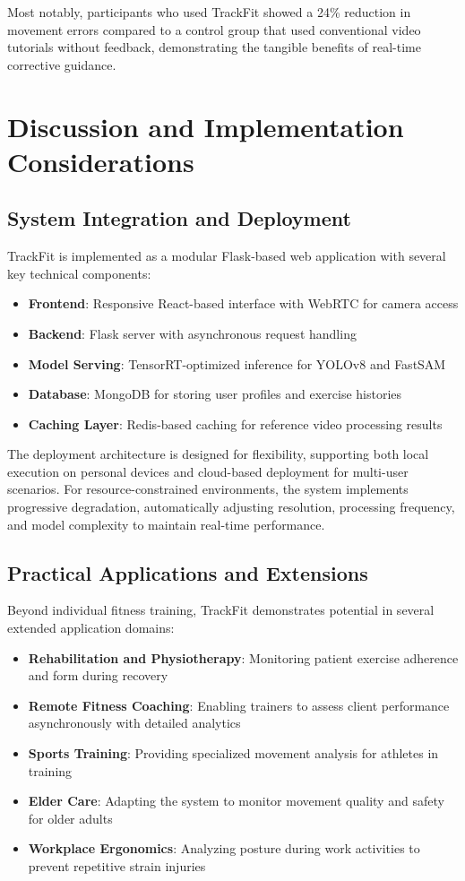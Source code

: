 \documentclass[conference]{IEEEtran}
\begin{document}
Most notably, participants who used TrackFit showed a 24\% reduction in movement errors compared to a control group that used conventional video tutorials without feedback, demonstrating the tangible benefits of real-time corrective guidance.

\section{Discussion and Implementation Considerations}

\subsection{System Integration and Deployment}
TrackFit is implemented as a modular Flask-based web application with several key technical components:

\begin{itemize}
    \item \textbf{Frontend}: Responsive React-based interface with WebRTC for camera access
    \item \textbf{Backend}: Flask server with asynchronous request handling
    \item \textbf{Model Serving}: TensorRT-optimized inference for YOLOv8 and FastSAM
    \item \textbf{Database}: MongoDB for storing user profiles and exercise histories
    \item \textbf{Caching Layer}: Redis-based caching for reference video processing results
\end{itemize}

The deployment architecture is designed for flexibility, supporting both local execution on personal devices and cloud-based deployment for multi-user scenarios. For resource-constrained environments, the system implements progressive degradation, automatically adjusting resolution, processing frequency, and model complexity to maintain real-time performance.

\subsection{Practical Applications and Extensions}
Beyond individual fitness training, TrackFit demonstrates potential in several extended application domains:

\begin{itemize}
    \item \textbf{Rehabilitation and Physiotherapy}: Monitoring patient exercise adherence and form during recovery
    \item \textbf{Remote Fitness Coaching}: Enabling trainers to assess client performance asynchronously with detailed analytics
    \item \textbf{Sports Training}: Providing specialized movement analysis for athletes in training
    \item \textbf{Elder Care}: Adapting the system to monitor movement quality and safety for older adults
    \item \textbf{Workplace Ergonomics}: Analyzing posture during work activities to prevent repetitive strain injuries
\end{itemize}
\end{document}
